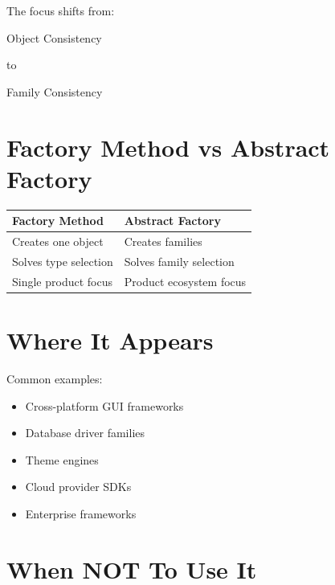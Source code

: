 \documentclass[11pt,a4paper]{book}
\begin{document}
The focus shifts from:

\begin{center}
Object Consistency
\end{center}

to

\begin{center}
Family Consistency
\end{center}


\section{Factory Method vs Abstract Factory}

\begin{center}
\begin{tabular}{|p{5cm}|p{5cm}|}
\hline
Factory Method & Abstract Factory \\
\hline
Creates one object & Creates families \\
\hline
Solves type selection & Solves family selection \\
\hline
Single product focus & Product ecosystem focus \\
\hline
\end{tabular}
\end{center}


\section{Where It Appears}

Common examples:

\begin{itemize}

\item Cross-platform GUI frameworks
\item Database driver families
\item Theme engines
\item Cloud provider SDKs
\item Enterprise frameworks

\end{itemize}


\section{When NOT To Use It}
\end{document}

